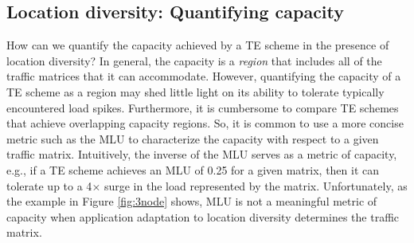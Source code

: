 


\subsection{Location diversity: Quantifying capacity}

How can we quantify the capacity achieved by a TE scheme in the presence of location diversity? In general, the capacity is a {\em region} that includes all of the traffic matrices that it can accommodate. However, quantifying the capacity of a TE scheme as a region may shed little light on its ability to tolerate typically encountered load spikes. Furthermore, it is cumbersome to compare TE schemes that achieve overlapping capacity regions. So, it is common to use a more concise metric such as the MLU to characterize the capacity with respect to a given traffic matrix. Intuitively, the inverse of the MLU serves as a metric of capacity, e.g., if a TE scheme achieves an MLU of 0.25 for a given matrix, then it can tolerate up to a 4$\times$ surge in the load represented by the matrix. Unfortunately, as the example in Figure \ref{fig:3node} shows, MLU is not a meaningful metric of capacity when application adaptation to location diversity  determines the traffic matrix.  

